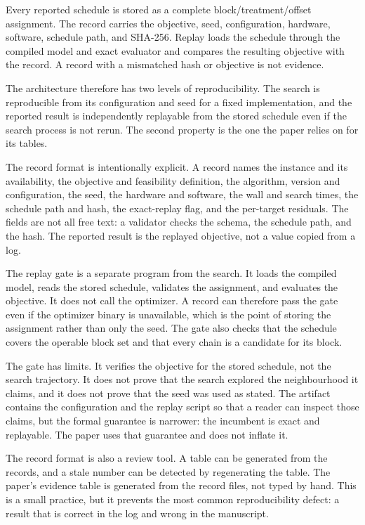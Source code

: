 \documentclass[preprint,11pt]{elsarticle}
\begin{document}
Every reported schedule is stored as a complete block/treatment/offset assignment. The record carries the objective, seed, configuration, hardware, software, schedule path, and SHA-256. Replay loads the schedule through the compiled model and exact evaluator and compares the resulting objective with the record. A record with a mismatched hash or objective is not evidence.

The architecture therefore has two levels of reproducibility. The search is reproducible from its configuration and seed for a fixed implementation, and the reported result is independently replayable from the stored schedule even if the search process is not rerun. The second property is the one the paper relies on for its tables.

The record format is intentionally explicit. A record names the instance and its availability, the
objective and feasibility definition, the algorithm, version and configuration, the seed, the hardware
and software, the wall and search times, the schedule path and hash, the exact-replay flag, and the
per-target residuals. The fields are not all free text: a validator checks the schema, the schedule
path, and the hash. The reported result is the replayed objective, not a value copied from a log.

The replay gate is a separate program from the search. It loads the compiled model, reads the stored
schedule, validates the assignment, and evaluates the objective. It does not call the optimizer. A
record can therefore pass the gate even if the optimizer binary is unavailable, which is the point of
storing the assignment rather than only the seed. The gate also checks that the schedule covers the
operable block set and that every chain is a candidate for its block.

The gate has limits. It verifies the objective for the stored schedule, not the search trajectory. It
does not prove that the search explored the neighbourhood it claims, and it does not prove that the
seed was used as stated. The artifact contains the configuration and the replay script so that a
reader can inspect those claims, but the formal guarantee is narrower: the incumbent is exact and
replayable. The paper uses that guarantee and does not inflate it.

The record format is also a review tool. A table can be generated from the records, and a stale number
can be detected by regenerating the table. The paper's evidence table is generated from the record
files, not typed by hand. This is a small practice, but it prevents the most common reproducibility
defect: a result that is correct in the log and wrong in the manuscript.
\end{document}
